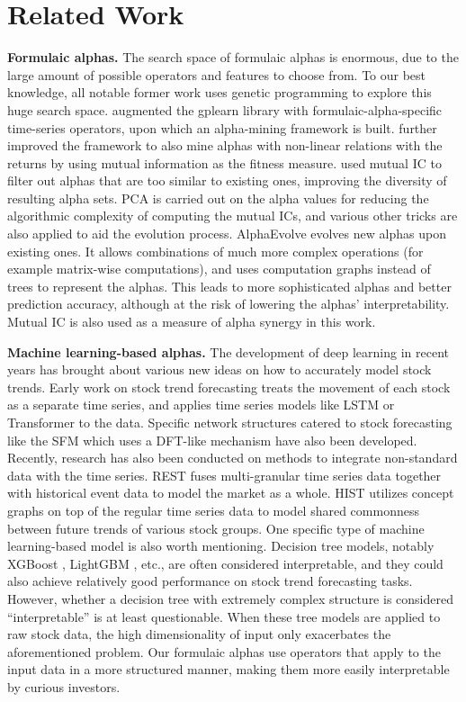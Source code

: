 \section{Related Work}\label{sec:relatedwork}

\textbf{Formulaic alphas.} The search space of formulaic alphas is enormous, due to the large amount of possible operators and features to choose from. To our best knowledge, all notable former work uses genetic programming to explore this huge search space. \cite{huataigp} augmented the gplearn library with formulaic-alpha-specific time-series operators, upon which an alpha-mining framework is built. \cite{huataigp2} further improved the framework to also mine alphas with non-linear relations with the returns by using mutual information as the fitness measure. \cite{autoalpha} used mutual IC to filter out alphas that are too similar to existing ones, improving the diversity of resulting alpha sets. PCA is carried out on the alpha values for reducing the algorithmic complexity of computing the mutual ICs, and various other tricks are also applied to aid the evolution process. AlphaEvolve \cite{alphaevolve} evolves new alphas upon existing ones. It allows combinations of much more complex operations (for example matrix-wise computations), and uses computation graphs instead of trees to represent the alphas. This leads to more sophisticated alphas and better prediction accuracy, although at the risk of lowering the alphas' interpretability. Mutual IC is also used as a measure of alpha synergy in this work.

\textbf{Machine learning-based alphas.} The development of deep learning in recent years has brought about various new ideas on how to accurately model stock trends. Early work on stock trend forecasting treats the movement of each stock as a separate time series, and applies time series models like LSTM \cite{lstm} or Transformer \cite{transformer} to the data. Specific network structures catered to stock forecasting like the SFM \cite{sfm} which uses a DFT-like mechanism have also been developed. Recently, research has also been conducted on methods to integrate non-standard data with the time series. REST \cite{rest} fuses multi-granular time series data together with historical event data to model the market as a whole. HIST \cite{hist} utilizes concept graphs on top of the regular time series data to model shared commonness between future trends of various stock groups. One specific type of machine learning-based model is also worth mentioning. Decision tree models, notably XGBoost \cite{xgb}, LightGBM \cite{lgbm}, etc., are often considered interpretable, and they could also achieve relatively good performance on stock trend forecasting tasks. However, whether a decision tree with extremely complex structure is considered ``interpretable'' is at least questionable. When these tree models are applied to raw stock data, the high dimensionality of input only exacerbates the aforementioned problem. Our formulaic alphas use operators that apply to the input data in a more structured manner, making them more easily interpretable by curious investors.

